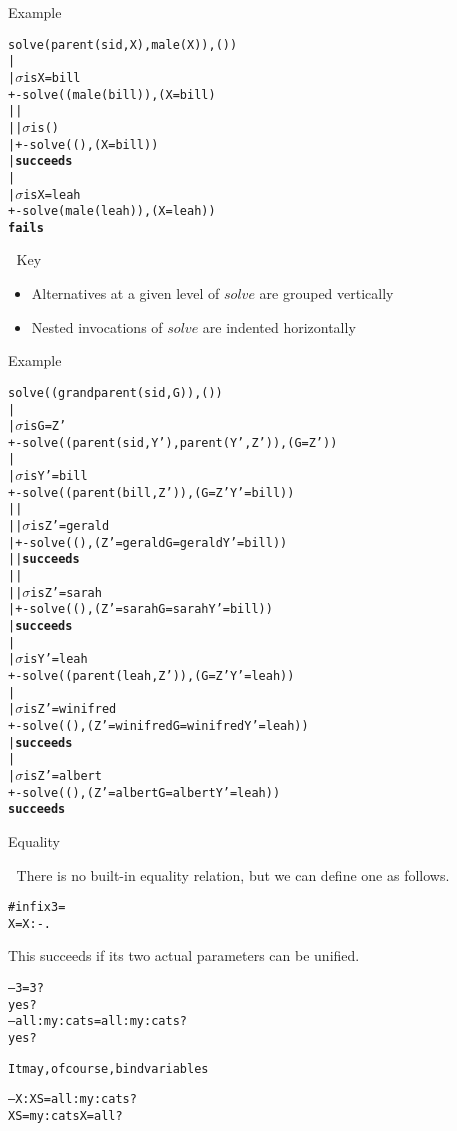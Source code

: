 \documentclass{popl}
\def\user#1{{#1}}
\newenvironment{smalltt}{\begin{alltt}\smaller}{\end{alltt}}
\def\sig#1{\(\sigma\)\textrm{ is }#1}
\def\succeeds{\textrm{\textbf{succeeds}}}
\def\fails{\textrm{\textbf{fails}}}
\begin{document}
\begin{foil} 
Example
\begin{smalltt}
    solve(parent(sid,X), male(X)), ())
    |
    |\sig{X=bill}
    +-solve((male(bill)), (X=bill)
    | |
    | |\sig{()}
    | +-solve((), (X=bill))
    |   \succeeds
    |
    |\sig{X=leah}
    +-solve(male(leah)), (X=leah))
      \fails
\end{smalltt}

Key
\begin{itemize}
\item Alternatives at a given level of $solve$ are grouped vertically
\item Nested invocations of $solve$ are indented horizontally
\end{itemize}
\end{foil}

\begin{foil} 
Example
\begin{smalltt}
    solve((grandparent(sid, G)), ())
    |
    |\sig{G=Z'}
    +-solve((parent(sid, Y'), parent(Y', Z')), (G=Z'))
      |
      |\sig{Y'=bill}
      +-solve((parent(bill, Z')), (G=Z' Y'=bill))
      | |
      | |\sig{Z'=gerald}
      | +-solve((), (Z'=gerald G=gerald Y'=bill))
      | | \succeeds
      | |
      | |\sig{Z'=sarah}
      | +-solve((), (Z'=sarah G=sarah Y'=bill))
      |   \succeeds
      |
      |\sig{Y'=leah}
      +-solve((parent(leah, Z')), (G=Z' Y'=leah))
        |
        |\sig{Z'=winifred}
        +-solve((), (Z'=winifred G=winifred Y'=leah))
        | \succeeds
        |
        |\sig{Z'=albert}
        +-solve((), (Z'=albert G=albert Y'=leah))
          \succeeds
\end{smalltt}
\end{foil}


\begin{foil} 
\begin{cframed}
Equality
\end{cframed}

There is no built-in equality relation, but we can define one as follows.
\begin{smalltt}
        #infix3 =
        X=X :- .
\end{smalltt}

This succeeds if its two actual parameters can be unified.
\begin{smalltt}
        -- \user{3=3?}
        yes ?
        -- \user{all:my:cats=all:my:cats?}
        yes ?
\begin{smalltt}

It may, of course, bind variables
\end{smalltt}
        -- \user{X:XS=all:my:cats?}
        XS = my : cats X = all ? 
\end{smalltt}
\end{foil}
\end{document}
